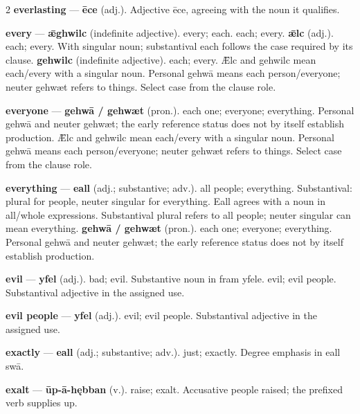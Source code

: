 \begin{multicols}{2}
\textbf{everlasting} — \textbf{ēce} (adj.). Adjective ēce, agreeing with the noun it qualifies.\par
\textbf{every} — \textbf{ǣghwilc} (indefinite adjective). every; each. each; every. \textbf{ǣlc} (adj.). each; every. With singular noun; substantival each follows the case required by its clause. \textbf{gehwilc} (indefinite adjective). each; every. Ǣlc and gehwilc mean each/every with a singular noun. Personal gehwā means each person/everyone; neuter gehwæt refers to things. Select case from the clause role.\par
\textbf{everyone} — \textbf{gehwā / gehwæt} (pron.). each one; everyone; everything. Personal gehwā and neuter gehwæt; the early reference status does not by itself establish production. Ǣlc and gehwilc mean each/every with a singular noun. Personal gehwā means each person/everyone; neuter gehwæt refers to things. Select case from the clause role.\par
\textbf{everything} — \textbf{eall} (adj.; substantive; adv.). all people; everything. Substantival: plural for people, neuter singular for everything. Eall agrees with a noun in all/whole expressions. Substantival plural refers to all people; neuter singular can mean everything. \textbf{gehwā / gehwæt} (pron.). each one; everyone; everything. Personal gehwā and neuter gehwæt; the early reference status does not by itself establish production.\par
\textbf{evil} — \textbf{yfel} (adj.). bad; evil. Substantive noun in fram yfele. evil; evil people. Substantival adjective in the assigned use.\par
\textbf{evil people} — \textbf{yfel} (adj.). evil; evil people. Substantival adjective in the assigned use.\par
\textbf{exactly} — \textbf{eall} (adj.; substantive; adv.). just; exactly. Degree emphasis in eall swā.\par
\textbf{exalt} — \textbf{ūp-ā-hębban} (v.). raise; exalt. Accusative people raised; the prefixed verb supplies up.\par

\end{multicols}
